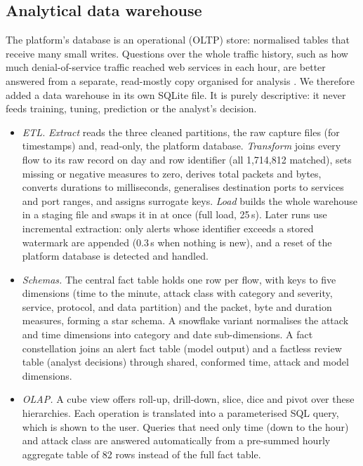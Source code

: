 \documentclass[conference]{IEEEtran}
\begin{document}
\subsection{Analytical data warehouse}\label{sec:dw}
The platform's database is an operational (OLTP) store: normalised tables that receive many small
writes. Questions over the whole traffic history, such as how much denial-of-service traffic
reached web services in each hour, are better answered from a separate, read-mostly copy organised
for analysis \cite{chaudhuri1997overview,kimball2013toolkit}. We therefore added a data warehouse
in its own SQLite file. It is purely descriptive: it never feeds training, tuning, prediction or the
analyst's decision.
\begin{itemize}
\item \textit{ETL.} \emph{Extract} reads the three cleaned partitions, the raw capture files
(for timestamps) and, read-only, the platform database. \emph{Transform} joins every flow to its
raw record on day and row identifier (all 1,714,812 matched), sets missing or negative measures to
zero, derives total packets and bytes, converts durations to milliseconds, generalises destination
ports to services and port ranges, and assigns surrogate keys. \emph{Load} builds the whole
warehouse in a staging file and swaps it in at once (full load, 25\,s). Later runs use
incremental extraction: only alerts whose identifier exceeds a stored watermark are appended
(0.3\,s when nothing is new), and a reset of the platform database is detected and handled.
\item \textit{Schemas.} The central fact table holds one row per flow, with keys to five
dimensions (time to the minute, attack class with category and severity, service, protocol, and
data partition) and the packet, byte and duration measures, forming a star schema. A snowflake
variant normalises the attack and time dimensions into category and date sub-dimensions. A fact
constellation joins an alert fact table (model output) and a factless review table (analyst
decisions) through shared, conformed time, attack and model dimensions.
\item \textit{OLAP.} A cube view offers roll-up, drill-down, slice, dice and pivot over these
hierarchies. Each operation is translated into a parameterised SQL query, which is shown to the
user. Queries that need only time (down to the hour) and attack class are answered automatically
from a pre-summed hourly aggregate table of 82 rows instead of the full fact table.
\end{itemize}
\end{document}
